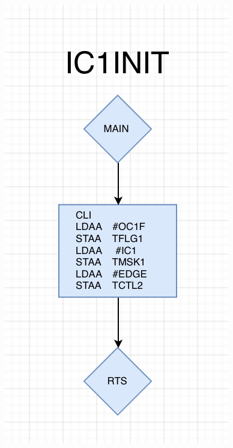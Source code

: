 \documentclass[12pt]{report}
\begin{document}
\begin{center}
     \includegraphics[scale=0.73]{init.PNG}\\

\end{center}
\end{document}
